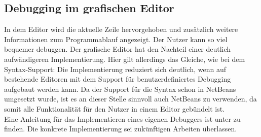 \subsection{Debugging im grafischen Editor}
In dem Editor wird die aktuelle Zeile hervorgehoben und zusätzlich weitere Informationen zum Programmablauf angezeigt.
Der Nutzer kann so viel bequemer debuggen.
Der grafische Editor hat den Nachteil einer deutlich aufwändigeren Implementierung.
Hier gilt allerdings das Gleiche, wie bei dem Syntax-Support:
Die Implementierung reduziert sich deutlich, wenn auf bestehende Editoren mit dem Support für benutzerdefiniertes Debugging aufgebaut werden kann.
Da der Support für die Syntax schon in NetBeans umgesetzt wurde, ist es an dieser Stelle sinnvoll auch NetBeans zu verwenden, da somit alle Funktionalität für den Nutzer in einem Editor gebündelt ist.\\
Eine Anleitung für das Implementieren eines eigenen Debuggers ist unter \cite{netbeansDebugger} zu finden.
Die konkrete Implementierung sei zukünftigen Arbeiten überlassen.

\endinput
